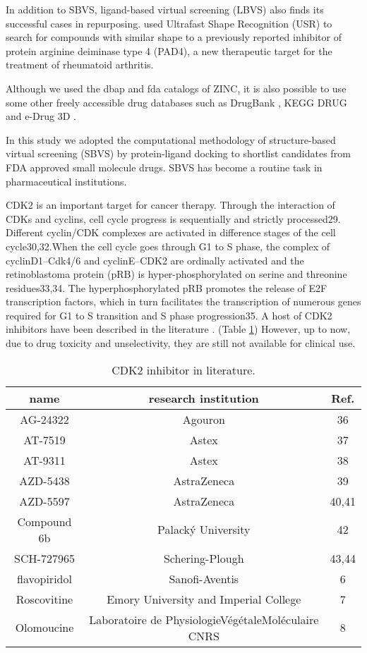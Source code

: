 In addition to SBVS, ligand-based virtual screening (LBVS) also finds its successful cases in repurposing. \citep{1504} used Ultrafast Shape Recognition (USR) \citep{1379} to search for compounds with similar shape to a previously reported inhibitor of protein arginine deiminase type 4 (PAD4), a new therapeutic target for the treatment of rheumatoid arthritis.

Although we used the dbap and fda catalogs of ZINC, it is also possible to use some other freely accessible drug databases such as DrugBank \citep{1594}, KEGG DRUG \citep{1595} and e-Drug 3D \citep{1125}.


In this study we adopted the computational methodology of structure-based virtual screening (SBVS) by protein-ligand docking to shortlist candidates from FDA approved small molecule drugs. SBVS has become a routine task in pharmaceutical institutions.

CDK2 is an important target for cancer therapy. Through the interaction of CDKs and cyclins, cell cycle progress is sequentially and strictly processed29. Different cyclin/CDK complexes are activated in difference stages of the cell cycle30,32.When the cell cycle goes through G1 to S phase, the complex of cyclinD1–Cdk4/6 and cyclinE–CDK2 are ordinally activated and the retinoblastoma protein (pRB) is hyper-phosphorylated on serine and threonine residues33,34. The hyperphosphorylated pRB promotes the release of E2F transcription factors, which in turn facilitates the transcription of numerous genes required for G1 to S transition and S phase progression35. A host of CDK2 inhibitors have been described in the literature . (Table \ref{cdk2:KnownInhibitors}) However, up to now, due to drug toxicity and unselectivity, they are still not available for clinical use.

\begin{table}
\caption{CDK2 inhibitor in literature.}
\label{cdk2:KnownInhibitors}
\begin{tabular}{ccc}
\hline
name & research institution & Ref.\\
\hline
AG-24322 & Agouron & 36\\
AT-7519 & Astex & 37\\
AT-9311 & Astex & 38\\
AZD-5438 & AstraZeneca & 39\\
AZD-5597 & AstraZeneca & 40,41\\
Compound 6b & Palacký University & 42\\
SCH-727965 & Schering-Plough & 43,44\\
flavopiridol & Sanofi-Aventis & 6\\
Roscovitine & Emory University and Imperial College & 7\\
Olomoucine & Laboratoire de PhysiologieVégétaleMoléculaire CNRS & 8\\
\hline
\end{tabular}
\end{table}

